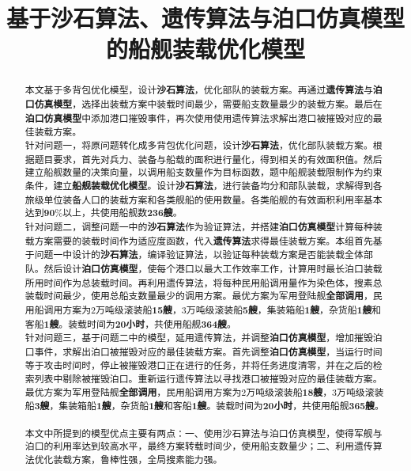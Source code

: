 \documentclass{whutmod}
\title{基于沙石算法、遗传算法与泊口仿真模型的船舰装载优化模型}
\begin{document}
\maketitle
	
	\begin{abstract}


本文基于多背包优化模型，设计\textbf{沙石算法}，优化部队的装载方案。再通过\textbf{遗传算法}与\textbf{泊口仿真模型}，选择出装载方案中装载时间最少，需要船支数量最少的装载方案。最后在\textbf{泊口仿真模型}中添加港口摧毁事件，再次使用使用遗传算法求解出港口被摧毁对应的最佳装载方案。
~\\

针对问题一，将原问题转化成多背包优化问题，设计\textbf{沙石算法}，优化部队装载方案。根据题目要求，首先对兵力、装备与船载的面积进行量化，得到相关的有效面积值。然后建立船舰数量的决策向量，以调用船支数量作为目标函数，题中船舰装载限制作为约束条件，建立\textbf{船舰装载优化模型}。设计\textbf{沙石算法}，进行装备均分和部队装载，求解得到各旅级单位装备人口的装载方案和各类舰船的使用数量。各类船舰的有效面积利用率基本达到$\textbf{90\%}$以上，共使用船舰数\textbf{236艘}。
~\\

针对问题二，调整问题一中的\textbf{沙石算法}作为验证算法，并搭建\textbf{泊口仿真模型}计算每种装载方案需要的装载时间作为适应度函数，代入\textbf{遗传算法}求得最佳装载方案。本组首先基于问题一中设计的\textbf{沙石算法}，编译验证算法，以验证每种装载方案是否能装载全体部队。然后设计\textbf{泊口仿真模型}，使每个港口以最大工作效率工作，计算用时最长泊口装载所用时间作为总装载时间。再利用遗传算法，将每种民用船调用量作为染色体，搜素总装载时间最少，使用总船支数量最少的调用方案。最优方案为军用登陆舰\textbf{全部调用}，民用船调用方案为2万吨级滚装船\textbf{15艘}，3万吨级滚装船\textbf{5艘}，集装箱船\textbf{1艘}，杂货船\textbf{1艘}和客船\textbf{1艘}。装载时间为\textbf{20小时}，共使用船舰\textbf{364艘}。
~\\

针对问题三，基于问题二中的模型，延用遗传算法，并调整\textbf{泊口仿真模型}，增加摧毁泊口事件，求解出泊口被摧毁对应的最佳装载方案。首先调整\textbf{泊口仿真模型}，当运行时间等于攻击时间时，停止被摧毁港口正在进行的任务，并将任务进度清零，并在之后的检索列表中剔除被摧毁泊口。重新运行遗传算法以寻找港口被摧毁对应的最佳装载方案。最优方案为军用登陆舰\textbf{全部调用}，民用船调用方案为2万吨级滚装船\textbf{18艘}，3万吨级滚装船\textbf{3艘}，集装箱船\textbf{1艘}，杂货船\textbf{1艘}和客船\textbf{1艘}。装载时间为\textbf{20小时}，共使用船舰\textbf{365艘}。
~\\

本文中所提到的模型优点主要有两点：一、使用沙石算法与泊口仿真模型，使得军舰与泊口的利用率达到较高水平，最终方案转载时间少，使用船支数量少；二、利用遗传算法优化装载方案，鲁棒性强，全局搜素能力强。

	
  







	\end{abstract}
	
\end{document}
